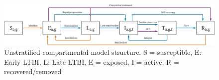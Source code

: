 \begin{figure}[ht]
    \includegraphics[width=\textwidth]{../../tex_descriptions/models/tuberculosis/model.png}
    \caption[Unstratified compartmental model structure.]{Unstratified compartmental model structure. \small S = susceptible, E: Early LTBI, L: Late LTBI, E = exposed, I = active, R = recovered/removed}
    \label{fig:seeiir}
\end{figure}